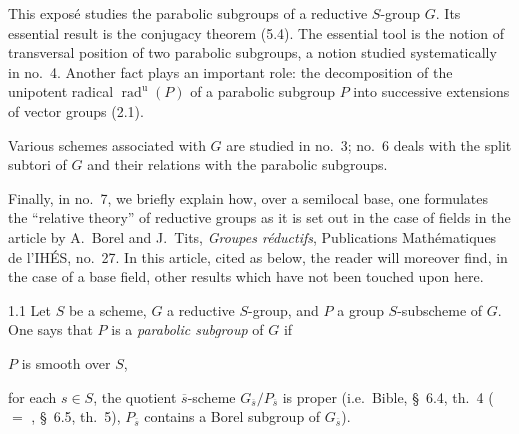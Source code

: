 \label{XXVI}

\setcounter{footnote}{-1}
This expos\'e studies the parabolic subgroups of a reductive $S$-group $G$. Its essential result is the conjugacy theorem (5.4). The essential tool is the notion of transversal position of two parabolic subgroups, a notion studied systematically in no.~4. Another fact plays an important role: the decomposition of the unipotent radical $\operatorname{rad}^{\mathrm u}(P)$ of a parabolic subgroup $P$ into successive extensions of vector groups (2.1).

Various schemes associated with $G$ are studied in no.~3; no.~6 deals with the split subtori of $G$ and their relations with the parabolic subgroups.

Finally, in no.~7, we briefly explain how, over a semilocal base, one formulates the ``relative theory'' of reductive groups as it is set out in the case of fields in the article by A.~Borel and J.~Tits, \textit{Groupes r\'eductifs}, Publications Math\'ematiques de l'IH\'ES, no.~27. In this article, cited as \cite{BT65} below, the reader will moreover find, in the case of a base field, other results which have not been touched upon here.

\begin{definition}{1.1}\label{XXVI.1.1}
Let $S$ be a scheme, $G$ a reductive $S$-group, and $P$ a group $S$-subscheme of $G$. One says that $P$ is a \emph{parabolic subgroup} of $G$ if
\begin{enumeratei}
\item $P$ is smooth over $S$,
\item for each $s\in S$, the quotient $\overline s$-scheme $G_{\overline s}/P_{\overline s}$ is proper (i.e.~Bible, \S~6.4, th.~4 ($=$ \cite{Ch05}, \S~6.5, th.~5), $P_{\overline s}$ contains a Borel subgroup of $G_{\overline s}$).
\end{enumeratei}
\end{definition}

